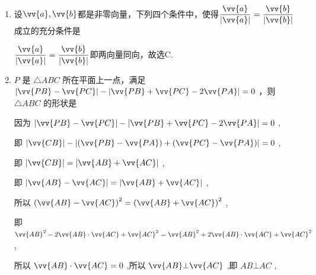 \begin{enumerate}
\begin{enumerate}
        \begin{jieda}
            对于C，若$\vv{a} = \vv{0}, \vv{b} \neq \vv{0}$，则两者共线但C不成立，因此C是两向量共线的充分非必要条件.
        \end{jieda}
        \item 设$\vv{a}, \vv{b}$都是非零向量，下列四个条件中，使得$\dfrac{\vv{a}}{|\vv{a}|} = \dfrac{\vv{b}}{|\vv{b}|}$成立的充分条件是
        \begin{jieda}
            $\dfrac{\vv{a}}{|\vv{a}|} = \dfrac{\vv{b}}{|\vv{b}|}$即两向量同向，故选C.
        \end{jieda}
        \item $P$ 是 $\bigtriangleup  {ABC}$ 所在平面上一点，满足 $\left| {\vv{PB} - \vv{PC}}\right|  - \left| {\vv{PB} + \vv{PC} - 2\vv{PA}}\right|  = 0$ ，则 $\bigtriangleup  {ABC}$ 的形状是
        \begin{jieda}
            因为 $\left| {\vv{PB} - \vv{PC}}\right|  - \left| {\vv{PB} + \vv{PC} - 2\vv{PA}}\right|  = 0$ ,
            
            即 $\left| \vv{CB}\right|  - \left| {\left( {\vv{PB} - \vv{PA}}\right)  + \left( {\vv{PC} - \vv{PA}}\right) }\right|  = 0$ ,
            
            即 $\left| \vv{CB}\right|  = \left| {\vv{AB} + \vv{AC}}\right|$ ,
            
            即 $\left| {\vv{AB} - \vv{AC}}\right|  = \left| {\vv{AB} + \vv{AC}}\right|$ ,
            
            所以 ${\left( \vv{AB} - \vv{AC}\right) }^{2} = {\left( \vv{AB} + \vv{AC}\right) }^{2}$ ,
            
            即 ${\vv{AB}}^{2} - 2\vv{AB} \cdot  \vv{AC} + {\vv{AC}}^{2} = {\vv{AB}}^{2} + 2\vv{AB} \cdot  \vv{AC} + {\vv{AC}}^{2}$ ,
            
            所以 $\vv{AB} \cdot  \vv{AC} = 0$ ,所以 $\vv{AB} \bot  \vv{AC}$ ,即 ${AB} \bot  {AC}$ ,
            

\end{jieda}
\end{enumerate}
\end{enumerate}
